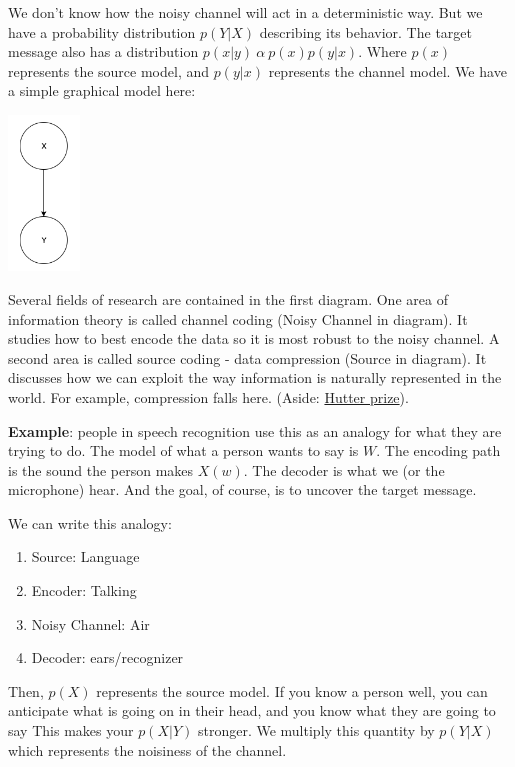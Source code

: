 \documentclass{article}
\begin{document}
\smallskip
We don't know how the noisy channel will act in a deterministic way. But we have a probability distribution $p(Y|X)$ describing its behavior. The target message also has a distribution $p(x|y) \ \alpha \ p(x) p(y|x)$. Where $p(x)$ represents the source model, and $p(y|x)$ represents the channel model. We have a simple graphical model here:

\begin{center}
\includegraphics[width=0.75in]{g-model.png}
\end{center}


\smallskip
Several fields of research are contained in the first diagram. One area of information theory is called channel coding (Noisy Channel in diagram). It studies how to best encode the data so it is most robust to the noisy channel. A second area is called source coding - data compression (Source in diagram). It discusses how we can exploit the way information is naturally represented in the world. For example, compression falls here. (Aside: \href{http://prize.hutter1.net/}{Hutter prize}).

\smallskip
\textbf{Example}: people in speech recognition use this as an analogy for what they are trying to do. The model of what a person wants to say is $W$. The encoding path is the sound the person makes $X(w)$. The decoder is what we (or the microphone) hear. And the goal, of course, is to uncover the target message.

\smallskip
We can write this analogy:
\begin{enumerate}
\item Source: Language
\item Encoder: Talking
\item Noisy Channel: Air
\item Decoder: ears/recognizer
\end{enumerate}

\smallskip
Then, $p(X)$ represents the source model. If you know a person well, you can anticipate what is going on in their head, and you know what they are going to say This makes your $p(X|Y)$ stronger. We multiply this quantity by $p(Y|X)$ which represents the noisiness of the channel.
\end{document}
